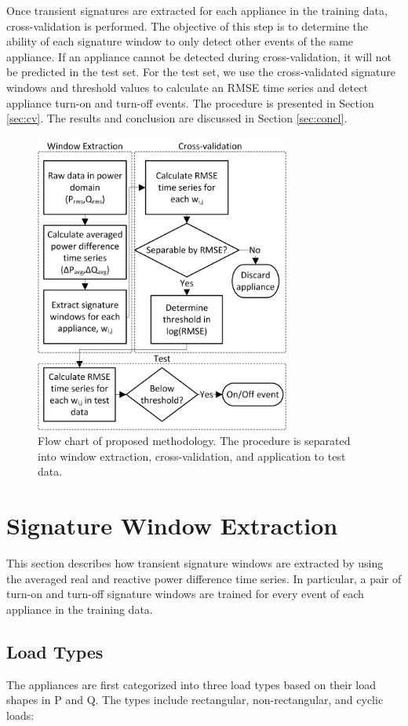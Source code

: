 \documentclass[conference]{IEEEtran}
\begin{document}
Once transient signatures are extracted for each appliance in the training data, cross-validation is performed.  The objective of this step is to determine the ability of each signature window to only detect other events of the same appliance. If an appliance cannot be detected during cross-validation, it will not be predicted in the test set. For the test set, we use the cross-validated signature windows and threshold values to calculate an RMSE time series and detect appliance turn-on and turn-off events. The procedure is presented in Section \ref{sec:cv}. The results and conclusion are discussed in Section \ref{sec:concl}.  

\begin{figure}[!t]
	\centering
	\includegraphics[width=3.3in]{fig/flow.png}
	\caption{Flow chart of proposed methodology.  The procedure is separated into window extraction, cross-validation, and application to test data.}
	\label{fig:flow}
\end{figure}


\section{Signature Window Extraction}\label{sec:training}
This section describes how transient signature windows are extracted by using the averaged real and reactive power difference time series.  In particular, a pair of turn-on and turn-off signature windows are trained for every event of each appliance in the training data.  


\subsection{Load Types}
The appliances are first categorized into three load types based on their load shapes in P and Q.  The types include rectangular, non-rectangular, and cyclic loads:
\end{document}

